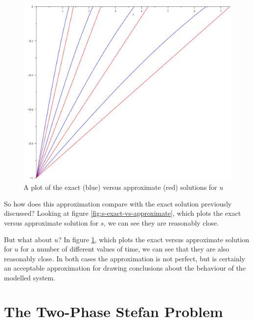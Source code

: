 \documentclass{report}
\begin{document}
\begin{figure}[b]
\centering
\includegraphics[scale = 0.15]{u-exact-vs-approximate}
\caption{A plot of the exact (blue) versus approximate (red) solutions for $u$}
\label{fig:u-exact-vs-approximate}
\end{figure}

So how does this approximation compare with the exact solution previously discussed? Looking at figure 
\ref{fig:s-exact-vs-approximate}, which plots the exact versus approximate solution for $s$, we can see 
they are reasonably close.\bigskip

But what about $u$? In figure \ref{fig:u-exact-vs-approximate}, which plots the exact versus approximate 
solution for $u$ for a number of different values of time, we can see that they are also reasonably close. 
In both cases the approximation is not perfect, but is certainly an acceptable approximation for drawing 
conclusions about the behaviour of the modelled system.
















\section{The Two-Phase Stefan Problem}
\end{document}
